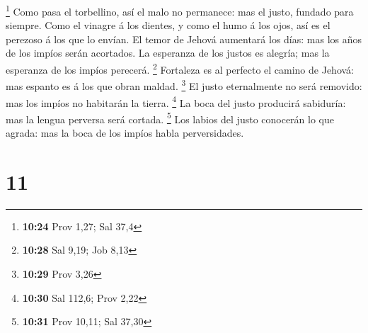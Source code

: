 \footnote{\textbf{10:24} Prov 1,27; Sal 37,4}  Como pasa el
torbellino, así el malo no permanece: mas el justo, fundado para
siempre.  Como el vinagre á los dientes, y como el humo á
los ojos, así es el perezoso á los que lo envían.  El temor
de Jehová aumentará los días: mas los años de los impíos serán
acortados.  La esperanza de los justos es alegría; mas la
esperanza de los impíos perecerá. \footnote{\textbf{10:28} Sal 9,19; Job
  8,13}  Fortaleza es al perfecto el camino de Jehová: mas
espanto es á los que obran maldad. \footnote{\textbf{10:29} Prov 3,26}
 El justo eternalmente no será removido: mas los impíos no
habitarán la tierra. \footnote{\textbf{10:30} Sal 112,6; Prov 2,22}
 La boca del justo producirá sabiduría: mas la lengua
perversa será cortada. \footnote{\textbf{10:31} Prov 10,11; Sal 37,30}
 Los labios del justo conocerán lo que agrada: mas la boca
de los impíos habla perversidades.

\hypertarget{section-10}{%
\section{11}\label{section-10}}

